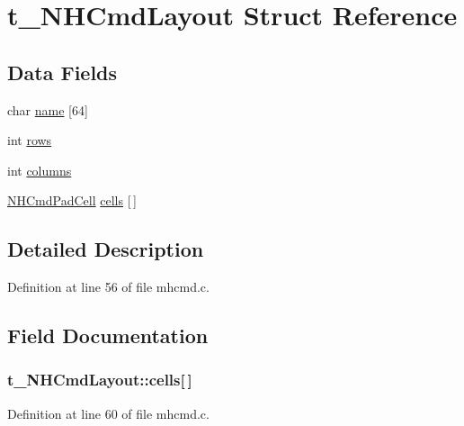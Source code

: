 \hypertarget{structt__NHCmdLayout}{\section{t\+\_\+\+N\+H\+Cmd\+Layout Struct Reference}
\label{structt__NHCmdLayout}
}
\subsection*{Data Fields}
\begin{DoxyCompactItemize}
\item 
char \hyperlink{structt__NHCmdLayout_a0545015938cf16c21bb813d4fe075ed7}{name} \mbox{[}64\mbox{]}
\item 
int \hyperlink{structt__NHCmdLayout_a54b0e456d1ffceb26fd2d3e0b7085878}{rows}
\item 
int \hyperlink{structt__NHCmdLayout_ae49b667aa9339a89e4bc0d15881506ca}{columns}
\item 
\hyperlink{mhcmd_8c_aeacf95bad2d8f850c1e9d842f2ff2b49}{N\+H\+Cmd\+Pad\+Cell} \hyperlink{structt__NHCmdLayout_ae1dd5f14888dfb6c57eecc5f37759789}{cells} \mbox{[}$\,$\mbox{]}
\end{DoxyCompactItemize}


\subsection{Detailed Description}


Definition at line 56 of file mhcmd.\+c.



\subsection{Field Documentation}
\hypertarget{structt__NHCmdLayout_ae1dd5f14888dfb6c57eecc5f37759789}{
\subsubsection[{cells}]{ t\+\_\+\+N\+H\+Cmd\+Layout\+::cells\mbox{[}$\,$\mbox{]}}}\label{structt__NHCmdLayout_ae1dd5f14888dfb6c57eecc5f37759789}


Definition at line 60 of file mhcmd.\+c.



